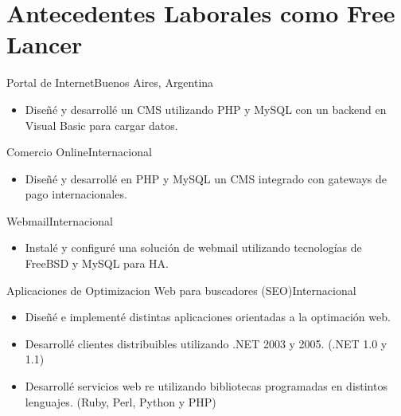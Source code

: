 \documentclass[a4paper,11pt]{moderncv}
\begin{document}
\section{Antecedentes Laborales como Free Lancer}
{Portal de Internet}{Buenos Aires, Argentina}{}{%
\begin{itemize}
  \item Dise\~n\'e y desarroll\'e un CMS utilizando PHP y MySQL con un backend en Visual Basic para cargar datos.
\end{itemize}
}
%
{Comercio Online}{Internacional}{}{%
\begin{itemize}
  \item Dise\~n\'e y desarroll\'e en PHP y MySQL un CMS integrado con gateways de pago internacionales.
\end{itemize}
}
%
{Webmail}{Internacional}{}{%
\begin{itemize}
  \item Instal\'e y configur\'e una soluci\'on de webmail utilizando tecnolog\'ias de FreeBSD y MySQL para HA.
\end{itemize}
}
%
{Aplicaciones de Optimizacion Web para buscadores (SEO)}{Internacional}{}{%
\begin{itemize}
  \item Dise\~n\'e e implement\'e distintas aplicaciones orientadas a la optimaci\'on web.
  \item Desarroll\'e clientes distribuibles utilizando .NET 2003 y 2005.  (.NET 1.0 y 1.1)
  \item Desarroll\'e servicios web re utilizando bibliotecas programadas en distintos lenguajes. (Ruby, Perl, Python y PHP)
\end{itemize}
}
\end{document}
